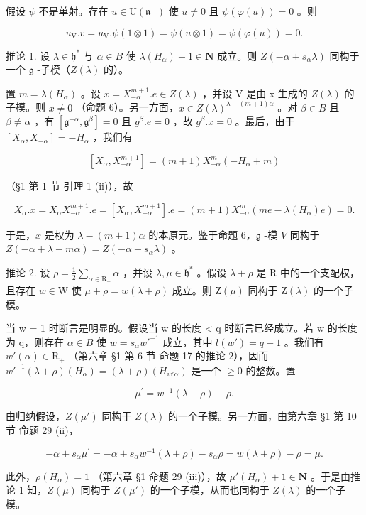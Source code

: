 假设 \(\psi\) 不是单射。存在 \(u \in \mathrm{U}(\mathfrak{n}_{-})\) 使 \(u \neq 0\) 且 \(\psi(\varphi(u)) = 0\) 。则

\[
u _ {\mathrm{V}}. v = u _ {\mathrm{V}}. \psi (1 \otimes 1) = \psi (u \otimes 1) = \psi (\varphi (u)) = 0.
\]

推论 1. 设 \(\lambda \in \mathfrak{h}^*\) 与 \(\alpha \in B\) 使 \(\lambda(H_{\alpha}) + 1 \in \mathbf{N}\) 成立。则 \(Z(-\alpha + s_{\alpha}\lambda)\) 同构于一个 \(\mathfrak{g}\) -子模（\(Z(\lambda)\) 的）。

置 \(m = \lambda(H_{\alpha})\) 。设 \(x = X_{-\alpha}^{m+1}.e \in Z(\lambda)\) ，并设 V 是由 x 生成的 \(Z(\lambda)\) 的子模。则 \(x \neq 0\) （命题 6）。另一方面，\(x \in Z(\lambda)^{\lambda-(m+1)\alpha}\) 。对 \(\beta \in B\) 且 \(\beta \neq \alpha\) ，有 \([\mathfrak{g}^{-\alpha}, \mathfrak{g}^{\beta}] = 0\) 且 \(g^{\beta}.e = 0\) ，故 \(g^{\beta}.x = 0\) 。最后，由于 \([X_{\alpha}, X_{-\alpha}] = -H_{\alpha}\) ，我们有

\[
[ X _ {\alpha}, X _ {- \alpha} ^ {m + 1} ] = (m + 1) X _ {- \alpha} ^ {m} (- H _ {\alpha} + m)
\]

（§1 第 1 节 引理 1 (ii)），故

\[
X _ {\alpha}. x = X _ {\alpha} X _ {- \alpha} ^ {m + 1}. e = [ X _ {\alpha}, X _ {- \alpha} ^ {m + 1} ]. e = (m + 1) X _ {- \alpha} ^ {m} (m e - \lambda (H _ {\alpha}) e) = 0.
\]

于是，\(x\) 是权为 \(\lambda - (m + 1)\alpha\) 的本原元。鉴于命题 6，\(\mathfrak{g}\) -模 \(V\) 同构于 \(Z(-\alpha + \lambda - m\alpha) = Z(-\alpha + s_{\alpha}\lambda)\) 。

推论 2. 设 \(\rho = \frac{1}{2}\sum_{\alpha \in \mathrm{R}_{+}}\alpha\) ，并设 \(\lambda, \mu \in \mathfrak{h}^*\) 。假设 \(\lambda + \rho\) 是 \(\mathrm{R}\) 中的一个支配权，且存在 \(w \in \mathrm{W}\) 使 \(\mu + \rho = w(\lambda + \rho)\) 成立。则 \(\mathrm{Z}(\mu)\) 同构于 \(\mathrm{Z}(\lambda)\) 的一个子模。

当 w = 1 时断言是明显的。假设当 w 的长度 \textless{} q 时断言已经成立。若 w 的长度为 q，则存在 \(\alpha \in B\) 使 \(w = s_{\alpha}w'^{-1}\) 成立，其中 \(l(w') = q - 1\) 。我们有 \(w'(\alpha) \in \mathrm{R}_{+}\) （第六章 §1 第 6 节 命题 17 的推论 2），因而 \(w'^{-1}(\lambda + \rho)(H_{\alpha}) = (\lambda + \rho)(H_{w'\alpha})\) 是一个 \(\geq 0\) 的整数。置

\[
\mu^ {\prime} = w ^ {- 1} (\lambda + \rho) - \rho .
\]

由归纳假设，\(Z(\mu')\) 同构于 \(Z(\lambda)\) 的一个子模。另一方面，由第六章 §1 第 10 节 命题 29 (ii)，

\[
- \alpha + s _ {\alpha} \mu^ {\prime} = - \alpha + s _ {\alpha} w ^ {- 1} (\lambda + \rho) - s _ {\alpha} \rho = w (\lambda + \rho) - \rho = \mu .
\]

此外，\(\rho(H_{\alpha}) = 1\) （第六章 §1 命题 29 (iii)），故 \(\mu'(H_{\alpha}) + 1 \in \mathbf{N}\) 。于是由推论 1 知，\(Z(\mu)\) 同构于 \(Z(\mu')\) 的一个子模，从而也同构于 \(Z(\lambda)\) 的一个子模。

